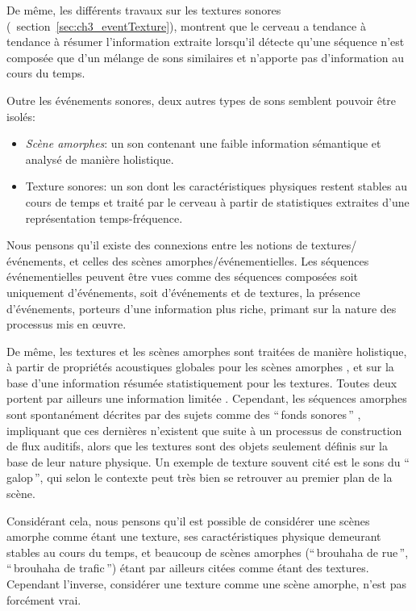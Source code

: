 De même, les différents travaux sur les textures sonores (\cf~section~\ref{sec:ch3_eventTexture}), montrent que le cerveau a tendance à tendance à résumer l'information extraite lorsqu'il détecte qu'une séquence n'est  composée que d'un mélange de sons similaires et n'apporte pas d'information au cours du temps. 

Outre les événements sonores, deux autres types de sons semblent pouvoir être isolés:

\begin{itemize}
\item \emph{Scène amorphes}: un son contenant une faible information sémantique et analysé de manière holistique.
\item {Texture sonores}: un son dont les caractéristiques physiques restent stables au cours de temps et traité par le cerveau à partir de statistiques extraites d'une représentation temps-fréquence.
\end{itemize}

Nous pensons qu'il existe des connexions entre les notions de textures/événements, et celles des scènes amorphes/événementielles. Les séquences événementielles peuvent être vues comme des séquences composées soit uniquement d'événements, soit d'événements et de textures, la présence d'événements, porteurs d'une information plus riche, primant sur la nature des processus mis en œuvre. 

De même, les textures et les scènes amorphes sont traitées de manière holistique, à partir de propriétés acoustiques globales pour les scènes amorphes \citep{dubois2006cognitive,maffiolo_caracterisation_1999}, et sur la base d'une information résumée statistiquement pour les textures\citep{mcdermott2013summary}. Toutes deux portent par ailleurs une information limitée \citep{saint1995classification,nelken2013ear}. Cependant, les séquences amorphes sont spontanément décrites par des sujets comme des ``\,fonds sonores\,'' \citep{maffiolo_caracterisation_1999,guastavino2006ideal}, impliquant que ces dernières n'existent que suite à un processus de construction de flux auditifs, alors que les textures sont des objets seulement définis sur la base de leur nature physique. Un exemple de texture souvent cité est le sons du ``\,galop\,'', qui selon le contexte peut très bien se retrouver au premier plan de la scène. 

Considérant cela, nous pensons qu'il est possible de considérer une scènes amorphe comme étant une texture, ses caractéristiques physique demeurant stables au cours du temps, et beaucoup de scènes amorphes (``\,brouhaha de rue\,'', ``\,brouhaha de trafic\,'') étant par ailleurs citées comme étant des textures. Cependant l'inverse, considérer une texture comme une scène amorphe, n'est pas forcément vrai.

